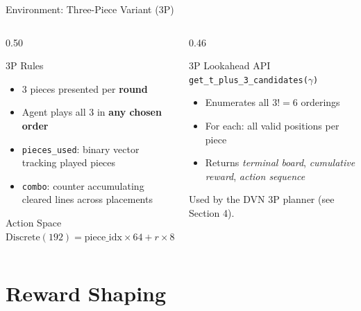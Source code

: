 \documentclass[aspectratio=169,10pt]{beamer}
\begin{document}
\begin{frame}{Environment: Three-Piece Variant (3P)}
\begin{columns}[T]
\begin{column}{0.50\textwidth}
\begin{block}{3P Rules}
\begin{itemize}
    \item 3 pieces presented per \textbf{round}
    \item Agent plays all 3 in \textbf{any chosen order}
    \item \texttt{pieces\_used}: binary vector tracking played pieces
    \item \texttt{combo}: counter accumulating cleared lines across placements
\end{itemize}
\end{block}

\begin{block}{Action Space}
$\text{Discrete}(192) = \text{piece\_idx} \times 64 + r \times 8 + c$
\end{block}
\end{column}

\begin{column}{0.46\textwidth}
\begin{alertblock}{3P Lookahead API}
\texttt{get\_t\_plus\_3\_candidates($\gamma$)}
\vspace{0.3em}
\begin{itemize}
    \item Enumerates all $3! = 6$ orderings
    \item For each: all valid positions per piece
    \item Returns \emph{terminal board}, \emph{cumulative reward}, \emph{action sequence}
\end{itemize}
Used by the DVN 3P planner (see Section 4).
\end{alertblock}
\end{column}
\end{columns}
\end{frame}

\section{Reward Shaping}
\end{document}
